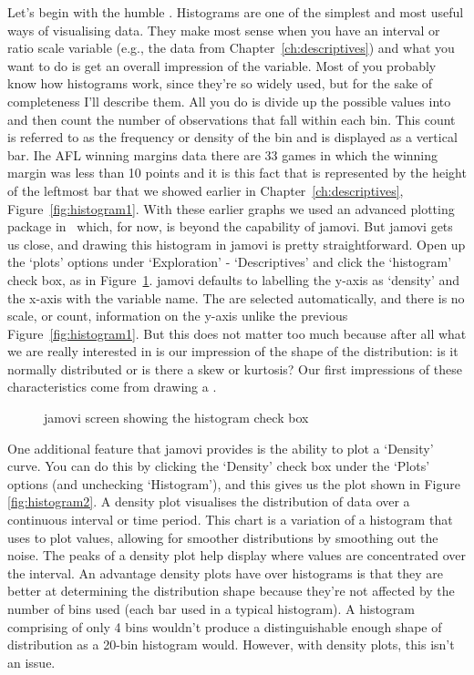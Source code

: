 Let's begin with the humble . Histograms are one of the simplest and most useful ways of visualising data. They make most sense when you have an interval or ratio scale variable (e.g., the  data from Chapter~\ref{ch:descriptives}) and what you want to do is get an overall impression of the variable. Most of you probably know how histograms work, since they're so widely used, but for the sake of completeness I'll describe them. All you do is divide up the possible values into  and then count the number of observations that fall within each bin. This count is referred to as the frequency or density of the bin and is displayed as a vertical bar. Ihe AFL winning margins data there are 33 games in which the winning margin was less than 10 points and it is this fact that is represented by the height of the leftmost bar that we showed earlier in Chapter~\ref{ch:descriptives}, Figure~\ref{fig:histogram1}. With these earlier graphs we used an advanced plotting package in \R\ which, for now, is beyond the capability of jamovi. But jamovi gets us close, and drawing this histogram in jamovi is pretty straightforward. Open up the `plots' options under `Exploration' - `Descriptives' and click the `histogram' check box, as in Figure~\ref{fig:jamovi_histogram}. jamovi defaults to labelling the y-axis as `density' and the x-axis with the variable name. The  are selected automatically, and there is no scale, or count, information on the y-axis unlike the previous Figure~\ref{fig:histogram1}. But this does not matter too much because after all what we are really interested in is our impression of the shape of the distribution: is it normally distributed or is there a skew or kurtosis? Our first impressions of these characteristics come from drawing a .

\begin{figure}[htb]
\begin{center}
\caption{jamovi screen showing the histogram check box}
\label{fig:jamovi_histogram}
\HR
\end{center}
\end{figure}

One additional feature that jamovi provides is the ability to plot a `Density' curve. You can do this by clicking the `Density' check box under the `Plots' options (and unchecking `Histogram'), and this gives us the plot shown in Figure \ref{fig:histogram2}. A density plot visualises the distribution of data over a continuous interval or time period. This chart is a variation of a histogram that uses  to plot values, allowing for smoother distributions by smoothing out the noise. The peaks of a density plot help display where values are concentrated over the interval. An advantage density plots have over histograms is that they are better at determining the distribution shape because they're not affected by the number of bins used (each bar used in a typical histogram). A histogram comprising of only 4 bins wouldn't produce a distinguishable enough shape of distribution as a 20-bin histogram would. However, with density plots, this isn't an issue. 

